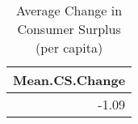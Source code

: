 \begin{table}[ht]
\centering
\begin{tabular}{r}
  \hline
Mean.CS.Change \\ 
  \hline
-1.09 \\ 
   \hline
\end{tabular}
\caption{Average Change in Consumer Surplus (per capita)} 
\label{tab:cs}
\end{table}
